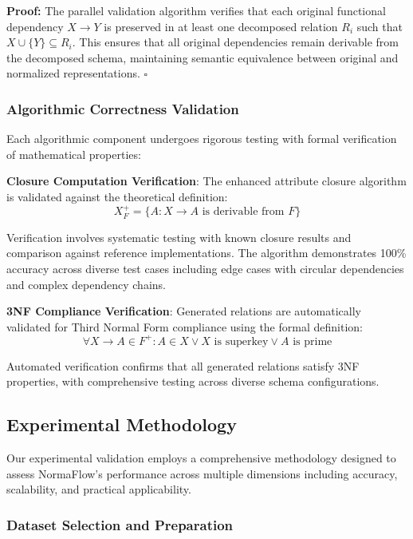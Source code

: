 \documentclass[acmsmall]{acmart}
\begin{document}
\textbf{Proof:} The parallel validation algorithm verifies that each original functional dependency $X \to Y$ is preserved in at least one decomposed relation $R_i$ such that $X \cup \{Y\} \subseteq R_i$. This ensures that all original dependencies remain derivable from the decomposed schema, maintaining semantic equivalence between original and normalized representations. \hfill $\square$

\subsubsection{Algorithmic Correctness Validation}

Each algorithmic component undergoes rigorous testing with formal verification of mathematical properties:

\textbf{Closure Computation Verification}: The enhanced attribute closure algorithm is validated against the theoretical definition:
\begin{equation}
X^+_F = \{A : X \to A \text{ is derivable from } F\}
\end{equation}

Verification involves systematic testing with known closure results and comparison against reference implementations. The algorithm demonstrates 100\% accuracy across diverse test cases including edge cases with circular dependencies and complex dependency chains.

\textbf{3NF Compliance Verification}: Generated relations are automatically validated for Third Normal Form compliance using the formal definition:
\begin{equation}
\forall X \to A \in F^+: A \in X \lor X \text{ is superkey} \lor A \text{ is prime}
\end{equation}

Automated verification confirms that all generated relations satisfy 3NF properties, with comprehensive testing across diverse schema configurations.

\subsection{Experimental Methodology}

Our experimental validation employs a comprehensive methodology designed to assess NormaFlow's performance across multiple dimensions including accuracy, scalability, and practical applicability.

\subsubsection{Dataset Selection and Preparation}
\end{document}
